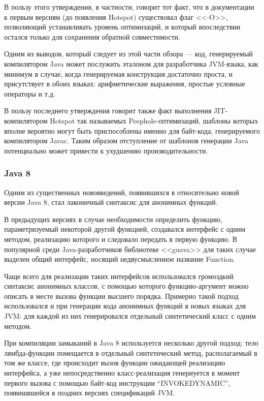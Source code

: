 В пользу этого утверждения, в частности, говорит тот факт, что в документации к первым версиям
(до появления Hotspot) существовал флаг
<<-O>>,
позволяющий устанавливать уровень оптимизаций, и который впоследствии остался только для
сохранения обратной совместимости.

Одним из выводов, который следует из этой части обзора --- код, генерируемый компилятором Java
может послужить эталоном для разработчика JVM-языка, как минимум в случае, когда
генерируемая конструкция достаточно проста, и присутствует в обоих языках: арифметические выражения,
простые условные операторы и т.д.

В пользу последнего утверждения говорит также факт выполнения JIT-компилятором Hotspot
так называемых Peephole-оптимизаций\cite{HotSpotDesign}, шаблоны которых вполне вероятно могут быть
приспособлены именно для байт-кода, генерируемого компилятором Javac.
Таким образом отступление от шаблонов генерации Java потенциально может привести к ухудшению
производительности.

\subsubsection{Java 8}
Одним из существенных нововведений, появившихся в относительно новой версии Java 8, стал лаконичный
синтаксис для анонимных функций.

В предыдущих версиях в случае необходимости определить функцию, параметризуемый некоторой другой
функцией, создавался интерфейс с одним методом, реализацию которого и следовало передать в первую
функцию.
В популярной среди Java-разработчиков библиотеке <<guava>> для таких случае выделен общий
интерфейс, носящий недвусмысленное название Function.

Чаще всего для реализации таких интерфейсов использовался громоздкий синтаксис анонимных классов,
с помощью которого функцию-аргумент можно описать в месте вызова функции высшего порядка.
Примерно такой подход использовался и при генерации кода анонимных функций в новых языках для JVM:
для каждой из них генерировался отдельный синтетический класс с одним методом.

При компиляции замыканий в Java 8 используется несколько другой подход\cite{J8LambdaTranslation}:
тело лямбда-функции помещается в отдельный синтетический метод, располагаемый в том же классе,
где происходит вызов функции ожидающей реализацию интерфейса, а уже непосредственно класс-реализация
генериуется в момент первого вызова с помощью байт-код инструкции ``INVOKEDYNAMIC'',
появишвшейся в поздних версиях спецификаций JVM.

